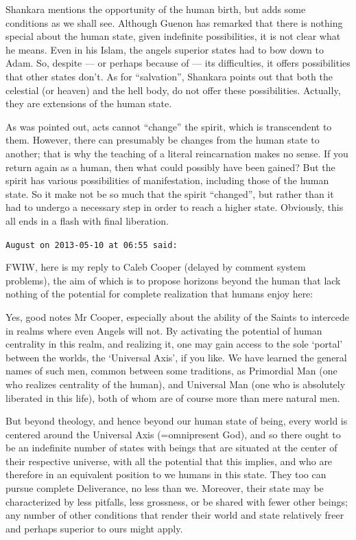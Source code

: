 \begin{footnotesize}
\begin{sffamily}
Shankara mentions the opportunity of the human birth, but adds some conditions as we shall see. Although Guenon has remarked that there is nothing special about the human state, given indefinite possibilities, it is not clear what he means. Even in his Islam, the angels superior states had to bow down to Adam. So, despite --- or perhaps because of --- its difficulties, it offers possibilities that other states don't. As for ``salvation'', Shankara points out that both the celestial (or heaven) and the hell body, do not offer these possibilities. Actually, they are extensions of the human state.

As was pointed out, acts cannot ``change'' the spirit, which is transcendent to them. However, there can presumably be changes from the human state to another; that is why the teaching of a literal reincarnation makes no sense. If you return again as a human, then what could possibly have been gained? But the spirit has various possibilities of manifestation, including those of the human state. So it make not be so much that the spirit ``changed'', but rather than it had to undergo a necessary step in order to reach a higher state. Obviously, this all ends in a flash with final liberation.

\hfill

\texttt{August on 2013-05-10 at 06:55 said:}

FWIW, here is my reply to Caleb Cooper (delayed by comment system problems), the aim of which is to propose horizons beyond the human that lack nothing of the potential for complete realization that humans enjoy here:

Yes, good notes Mr Cooper, especially about the ability of the Saints to intercede in realms where even Angels will not. By activating the potential of human centrality in this realm, and realizing it, one may gain access to the sole `portal' between the worlds, the `Universal Axis', if you like. We have learned the general names of such men, common between some traditions, as Primordial Man (one who realizes centrality of the human), and Universal Man (one who is absolutely liberated in this life), both of whom are of course more than mere natural men.

But beyond theology, and hence beyond our human state of being, every world is centered around the Universal Axis (=omnipresent God), and so there ought to be an indefinite number of states with beings that are situated at the center of their respective universe, with all the potential that this implies, and who are therefore in an equivalent position to we humans in this state. They too can pursue complete Deliverance, no less than we. Moreover, their state may be characterized by less pitfalls, less grossness, or be shared with fewer other beings; any number of other conditions that render their world and state relatively freer and perhaps superior to ours might apply.


\end{sffamily}
\end{footnotesize}
